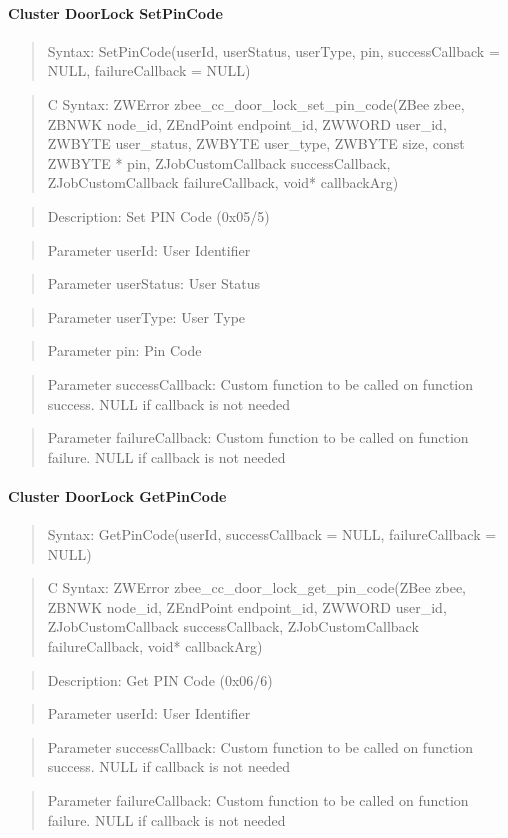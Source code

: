 \paragraph{Cluster DoorLock SetPinCode}
\begin{quote}Syntax: SetPinCode(userId, userStatus, userType, pin, successCallback = NULL, failureCallback = NULL)\end{quote}
\begin{quote}C Syntax: ZWError zbee\_cc\_door\_lock\_set\_pin\_code(ZBee zbee, ZBNWK node\_id, ZEndPoint endpoint\_id, ZWWORD user\_id, ZWBYTE user\_status, ZWBYTE user\_type, ZWBYTE size, const ZWBYTE * pin, ZJobCustomCallback successCallback, ZJobCustomCallback failureCallback, void* callbackArg)\end{quote}
\begin{quote}Description: Set PIN Code (0x05/5)\end{quote}
\begin{quote}Parameter userId: User Identifier\end{quote}
\begin{quote}Parameter userStatus: User Status\end{quote}
\begin{quote}Parameter userType: User Type\end{quote}
\begin{quote}Parameter pin: Pin Code\end{quote}
\begin{quote}Parameter successCallback: Custom function to be called on function success. NULL if callback is not needed\end{quote}
\begin{quote}Parameter failureCallback: Custom function to be called on function failure. NULL if callback is not needed\end{quote}


\paragraph{Cluster DoorLock GetPinCode}
\begin{quote}Syntax: GetPinCode(userId, successCallback = NULL, failureCallback = NULL)\end{quote}
\begin{quote}C Syntax: ZWError zbee\_cc\_door\_lock\_get\_pin\_code(ZBee zbee, ZBNWK node\_id, ZEndPoint endpoint\_id, ZWWORD user\_id, ZJobCustomCallback successCallback, ZJobCustomCallback failureCallback, void* callbackArg)\end{quote}
\begin{quote}Description: Get PIN Code (0x06/6)\end{quote}
\begin{quote}Parameter userId: User Identifier\end{quote}
\begin{quote}Parameter successCallback: Custom function to be called on function success. NULL if callback is not needed\end{quote}
\begin{quote}Parameter failureCallback: Custom function to be called on function failure. NULL if callback is not needed\end{quote}


